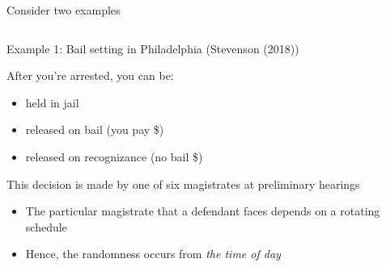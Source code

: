 \documentclass[notes,11pt, aspectratio=169]{beamer}
\newenvironment{wideitemize}{\itemize\addtolength{\itemsep}{10pt}}{\enditemize}
\begin{document}
\begin{frame}{Consider two examples}
  \begin{columns}[onlytextwidth, T] %
    \begin{column}{.50\textwidth}
      \begin{wideitemize}
      \item Example 1: Bail setting in Philadelphia (Stevenson (2018))
      \item After you're arrested, you can be:
        \begin{itemize}
        \item held in jail
        \item released on bail (you pay \$)
        \item released on recognizance (no bail \$)
        \end{itemize}
      \item This decision is made by one of six magistrates at
        preliminary hearings
        \begin{itemize}
        \item The particular magistrate that a defendant faces
          depends on a rotating schedule
        \item Hence, the randomness occurs from \emph{the time of
            day}
        \end{itemize}
      \end{wideitemize}
    \end{column}%
    \hfill%
    \begin{column}{.5\textwidth}
    \end{column}%
  \end{columns}
\end{frame}
\end{document}
